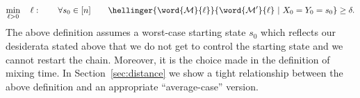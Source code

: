 \begin{align}
\min_{\ell>0} \quad \ell: \quad\quad \forall s_0\in[n]\quad\quad \hellinger{\word{\cal M}{\ell}}{\word{\cal M'}{\ell}~|~X_0=Y_0=s_0}\ge \delta. \label{eq:smallest_t_for_tv}
\end{align}
\noindent The above definition assumes a worst-case starting state $s_0$ which reflects our desiderata stated above that we do not get to control the starting state and we cannot restart the chain. Moreover, it is the choice made in the definition of mixing time. In Section~\ref{sec:distance} we show a tight relationship between the above definition and an appropriate ``average-case'' version. 
%
%






